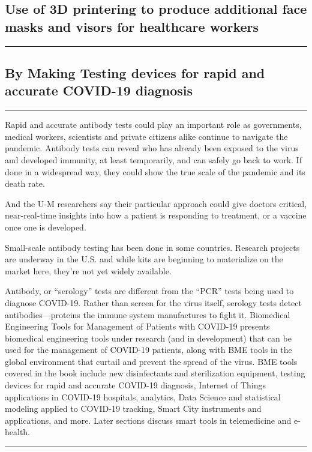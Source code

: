 \documentclass[12pt, letterpaper]{article}
\begin{document}
\subsection{Use of 3D printering to produce additional face masks and visors for healthcare workers}
\rule{\textwidth}{0.5pt}
\maketitle
\begin{center}
\section{By Making Testing devices for rapid and accurate COVID-19 diagnosis}
\rule{\textwidth}{0.5pt}
Rapid and accurate antibody tests could play an important role as governments, medical workers, scientists and private citizens alike continue to navigate the pandemic. Antibody tests can reveal who has already been exposed to the virus and developed immunity, at least temporarily, and can safely go back to work. If done in a widespread way, they could show the true scale of the pandemic and its death rate. 

And the U-M researchers say their particular approach could give doctors critical, near-real-time insights into how a patient is responding to treatment, or a vaccine once one is developed.

Small-scale antibody testing has been done in some countries. Research projects are underway in the U.S. and while kits are beginning to materialize on the market here, they’re not yet widely available.

Antibody, or “serology” tests are different from the “PCR” tests being used to diagnose COVID-19. Rather than screen for the virus itself, serology tests detect antibodies—proteins the immune system manufactures to fight it. 
Biomedical Engineering Tools for Management of Patients with COVID-19 presents biomedical engineering tools under research (and in development) that can be used for the management of COVID-19 patients, along with BME tools in the global environment that curtail and prevent the spread of the virus. BME tools covered in the book include new disinfectants and sterilization equipment, testing devices for rapid and accurate COVID-19 diagnosis, Internet of Things applications in COVID-19 hospitals, analytics, Data Science and statistical modeling applied to COVID-19 tracking, Smart City instruments and applications, and more. Later sections discuss smart tools in telemedicine and e-health.
\rule{\textwidth}{0.5pt}

\end{center}
\end{document}
